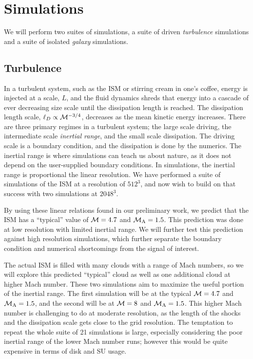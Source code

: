 \section{Simulations}
\label{sec.simulations}

We will perform two suites of simulations, a suite of driven \emph{turbulence}
simulations and a suite of isolated \emph{galaxy} simulations.

\subsection{Turbulence}

\def\vrms{\ensuremath{V_{r.m.s}}}

In a turbulent system, such as the ISM or stirring cream in one's coffee,
energy is injected at a scale, $L$, and the fluid dynamics shreds that energy
into a cascade of ever decreasing size scale until the dissipation length is
reached.  The dissipation length scale, $\ell_D\propto \mathcal{M}^{-3/4}$,
decreases as the mean kinetic energy increases.  There are three primary regimes
in a turbulent system; the large scale driving, the intermediate scale \emph{
inertial range},
and the small scale dissipation.  The driving scale is a boundary condition, and
the dissipation is done by the numerics.  
The inertial range is where simulations can teach us about nature, as it does
not depend on the user-supplied boundary conditions.  In simulations, the inertial range is
proportional the linear resolution.    We have performed a suite of simulations
of the ISM at a resolution of $512^3$, and now wish to build on that success
with two simulations at $2048^3$.

By using these linear relations found in our preliminary work,
 we predict that the ISM has a ``typical'' value of
$\mathcal{M}=4.7$ and $\mathcal{M_{\rm{A}}}=1.5$.  This prediction was done at low resolution with
limited inertial range.  
We will further test this prediction against high resolution simulations, which
further separate the boundary condition and numerical shortcomings from the
signal of interest.

The actual ISM is filled with many
clouds with a range of Mach numbers, so we will explore this predicted
``typical'' cloud as well as one additional cloud at higher Mach number.  
These two simulations aim to maximize the useful portion of the
inertial range.  The first simulation will be at the typical $\mathcal{M}=4.7$ and
$\mathcal{M_{\rm{A}}}=1.5$, and the second will be at $\mathcal{M}=8$ and $\mathcal{M_{\rm{A}}}=1.5$.  This
higher Mach number is challenging to do at moderate resolution, as the length of
the shocks and the dissipation scale gets close to the grid resolution.  
The temptation to repeat the whole suite of 21 simulations is large, especially
considering the poor inertial range of the lower Mach number runs; however this
would be quite expensive in terms of disk and SU usage.

